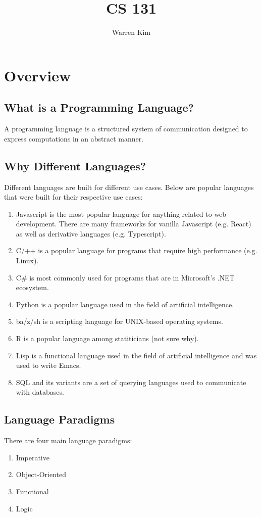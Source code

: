 \documentclass{article}
\title{CS 131}
\author{Warren Kim}
\begin{document}
\maketitle

\tableofcontents

\newpage
\section{Overview}

\subsection{What is a Programming Language?}  A programming language
is a structured system of communication designed to express
computations in an abstract manner.

\subsection{Why Different Languages?}  Different languages are built
for different use cases. Below are popular languages that were built
for their respective use cases:
\begin{enumerate}[label=(\roman*),align=left]
\item Javascript is the most popular language for anything related to
web development. There are many frameworks for vanilla Javascript
(e.g. React) as well as derivative languages (e.g. Typescript).
\item C/++ is a popular language for programs that require high
performance (e.g. Linux).
\item C\# is most commonly used for programs that are in Microsoft's
.NET ecosystem.
\item Python is a popular language used in the field of artificial
intelligence.
\item ba/z/sh is a scripting language for UNIX-based operating
systems.
\item R is a popular language among statiticians (not sure why).
\item Lisp is a functional language used in the field of artificial
intelligence and was used to write Emacs.
\item SQL and its variants are a set of querying languages used to
communicate with databases.
\end{enumerate}

\subsection{Language Paradigms} There are four main language paradigms:
\begin{enumerate}[label=(\roman*),align=left]
\item Imperative
\item Object-Oriented
\item Functional
\item Logic
\end{enumerate}
\end{document}
